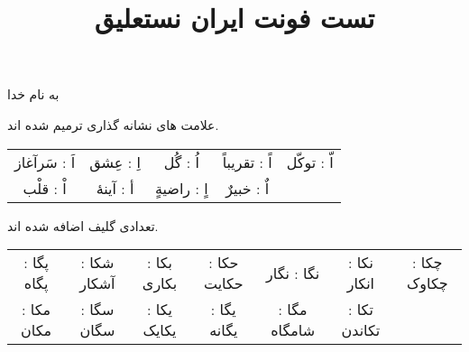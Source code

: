 \documentclass[14pt,a4paper]{article}
\begin{document}
\title{تست فونت ایران نستعلیق}
\author{ }\date{ }

\maketitle

\begin{center}
به نام خدا
\end{center}

علامت های نشانه گذاری ترمیم شده اند.

\vspace{3mm}
\begin{tabular}{c c c c c}
 اَ : سَرآغاز & اِ : عِشق & اُ : گُل & اً : تقریباً & اّ : توکّل \\
  اْ : قلْب & أ : آینهٔ & اٍ : راضیةٍ & اٌ : خبیرٌ & 
\end{tabular}
\vspace{3mm}

تعدادی گلیف اضافه شده اند.

\vspace{3mm}
\begin{tabular}{c c c c c c c}
پگا : پگاه & شکا : آشکار & بکا : بکاری & حکا : حکایت & نگا : نگار & نکا : انکار & چکا : چکاوک \\
مکا : مکان & سگا : سگان & یکا : یکایک & یگا : یگانه & مگا : شامگاه & تکا : تکاندن
\end{tabular}
\vspace{3mm}
\end{document}
